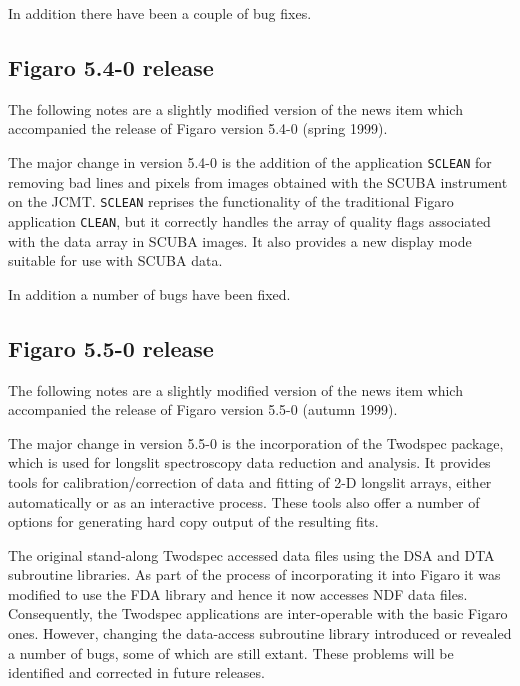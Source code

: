 \documentclass[11pt,twoside]{article}
\begin{document}
 In addition there have been a couple of bug fixes.


\subsection{\label{news540}Figaro 5.4-0 release}

 The following notes are a slightly modified version of the news item
 which accompanied the release of Figaro version 5.4-0 (spring 1999).

 The major change in version 5.4-0 is the addition of the application
 {\tt SCLEAN} for removing bad lines and pixels from images obtained with the
 SCUBA instrument on the JCMT.  {\tt SCLEAN} reprises the functionality of
 the traditional Figaro application {\tt CLEAN}, but it correctly handles the
 array of quality flags associated with the data array in SCUBA images.
 It also provides a new display mode suitable for use with SCUBA data.

 In addition a number of bugs have been fixed.

\subsection{\label{news550}Figaro 5.5-0 release}

 The following notes are a slightly modified version of the news item
 which accompanied the release of Figaro version 5.5-0 (autumn 1999).

 The major change in version 5.5-0 is the incorporation of the Twodspec
 package, which is used for
 longslit spectroscopy data reduction and analysis. It provides tools for
 calibration/correction of data and fitting of 2-D longslit arrays,
 either automatically or as an interactive process. These tools also
 offer a number of options for generating hard copy output of the
 resulting fits.

 The original stand-along Twodspec accessed data files using the DSA and
 DTA subroutine libraries.  As part of the process of incorporating it
 into Figaro it was modified to use the FDA library and hence it now accesses
 NDF data files.  Consequently, the Twodspec applications are inter-operable
 with the basic Figaro ones.  However, changing the data-access subroutine
 library introduced or revealed a number of bugs, some of which are still
 extant.  These problems will be identified and corrected in future releases.
\end{document}
